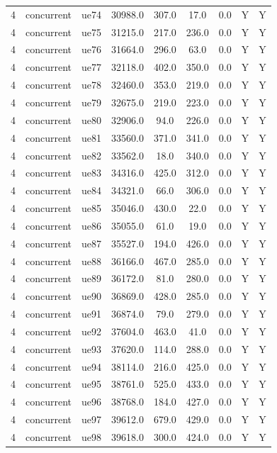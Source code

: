 \begin{table}[ht]
\begin{tabular}{|c|c|c|c|c|c|c|c|c|}
4 & concurrent & ue74 & 30988.0 & 307.0 & 17.0 & 0.0 & Y & Y \\
4 & concurrent & ue75 & 31215.0 & 217.0 & 236.0 & 0.0 & Y & Y \\
4 & concurrent & ue76 & 31664.0 & 296.0 & 63.0 & 0.0 & Y & Y \\
4 & concurrent & ue77 & 32118.0 & 402.0 & 350.0 & 0.0 & Y & Y \\
4 & concurrent & ue78 & 32460.0 & 353.0 & 219.0 & 0.0 & Y & Y \\
4 & concurrent & ue79 & 32675.0 & 219.0 & 223.0 & 0.0 & Y & Y \\
4 & concurrent & ue80 & 32906.0 & 94.0 & 226.0 & 0.0 & Y & Y \\
4 & concurrent & ue81 & 33560.0 & 371.0 & 341.0 & 0.0 & Y & Y \\
4 & concurrent & ue82 & 33562.0 & 18.0 & 340.0 & 0.0 & Y & Y \\
4 & concurrent & ue83 & 34316.0 & 425.0 & 312.0 & 0.0 & Y & Y \\
4 & concurrent & ue84 & 34321.0 & 66.0 & 306.0 & 0.0 & Y & Y \\
4 & concurrent & ue85 & 35046.0 & 430.0 & 22.0 & 0.0 & Y & Y \\
4 & concurrent & ue86 & 35055.0 & 61.0 & 19.0 & 0.0 & Y & Y \\
4 & concurrent & ue87 & 35527.0 & 194.0 & 426.0 & 0.0 & Y & Y \\
4 & concurrent & ue88 & 36166.0 & 467.0 & 285.0 & 0.0 & Y & Y \\
4 & concurrent & ue89 & 36172.0 & 81.0 & 280.0 & 0.0 & Y & Y \\
4 & concurrent & ue90 & 36869.0 & 428.0 & 285.0 & 0.0 & Y & Y \\
4 & concurrent & ue91 & 36874.0 & 79.0 & 279.0 & 0.0 & Y & Y \\
4 & concurrent & ue92 & 37604.0 & 463.0 & 41.0 & 0.0 & Y & Y \\
4 & concurrent & ue93 & 37620.0 & 114.0 & 288.0 & 0.0 & Y & Y \\
4 & concurrent & ue94 & 38114.0 & 216.0 & 425.0 & 0.0 & Y & Y \\
4 & concurrent & ue95 & 38761.0 & 525.0 & 433.0 & 0.0 & Y & Y \\
4 & concurrent & ue96 & 38768.0 & 184.0 & 427.0 & 0.0 & Y & Y \\
4 & concurrent & ue97 & 39612.0 & 679.0 & 429.0 & 0.0 & Y & Y \\
4 & concurrent & ue98 & 39618.0 & 300.0 & 424.0 & 0.0 & Y & Y \\

\end{tabular}
\end{table}
